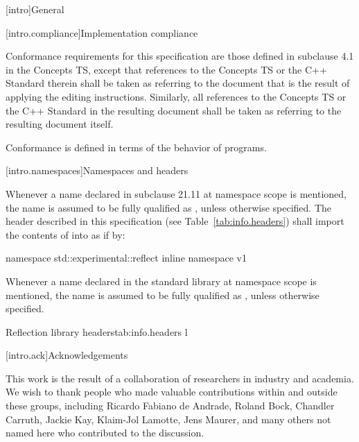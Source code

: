 
[intro]{General}

[intro.compliance]{Implementation compliance}

\pnum
Conformance requirements for this specification are those defined in subclause
4.1 in the Concepts TS, except that references to the Concepts TS or the C++
Standard therein shall be taken as referring to the document that is the result
of applying the editing instructions. Similarly, all references to the Concepts
TS or the C++ Standard in the resulting document shall be taken as referring to
the resulting document itself.
\begin{note}
Conformance is defined in terms of the behavior of programs.
\end{note}

[intro.namespaces]{Namespaces and headers}

\pnum
Whenever a name  declared in subclause 21.11 at namespace scope is
mentioned, the name  is assumed to be fully qualified as
, unless otherwise specified.
The header described in this specification (see Table~\ref{tab:info.headers})
shall import the contents of  into
 as if by:

\begin{codeblock}
namespace std::experimental::reflect {
  inline namespace v1 {}
}
\end{codeblock}

\pnum
Whenever a name  declared in the standard library at namespace scope is
mentioned, the name  is assumed to be fully qualified as
, unless otherwise specified.

\begin{floattable}{Reflection library headers}{tab:info.headers}
{l}
\topline
{} \\
\end{floattable}

[intro.ack]{Acknowledgements}

\pnum
This work is the result of a collaboration of researchers in industry and
academia.  We wish to thank people who made valuable contributions within and
outside these groups, including Ricardo Fabiano de Andrade, Roland Bock,
Chandler Carruth, Jackie Kay, Klaim-Jol Lamotte, Jens Maurer, and many others
not named here who contributed to the discussion.
